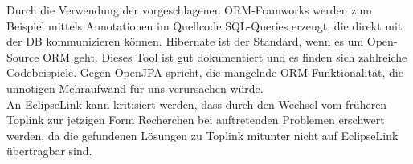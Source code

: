 \documentclass[enabledeprecatedfontcommands,fontsize=11pt,paper=a4,twoside]{scrartcl}
\newcounter{one}
\begin{document}
	\begin{onehalfspace}
		Durch die Verwendung der vorgeschlagenen ORM-Framworks werden zum Beispiel mittels Annotationen im Quellcode SQL-Queries erzeugt, die direkt mit der DB kommunizieren können. Hibernate ist der Standard, wenn es um Open-Source ORM geht. Dieses Tool ist gut dokumentiert und es finden sich zahlreiche Codebeispiele.
		Gegen OpenJPA spricht, die mangelnde ORM-Funktionalität, die unnötigen Mehraufwand für uns verursachen würde. \\
		An EclipseLink kann kritisiert werden, dass durch den Wechsel vom früheren Toplink zur jetzigen Form Recherchen bei auftretenden Problemen erschwert werden, da die gefundenen Lösungen zu Toplink mitunter nicht auf EclipseLink übertragbar sind.
	\end{onehalfspace}
	
\end{document}
